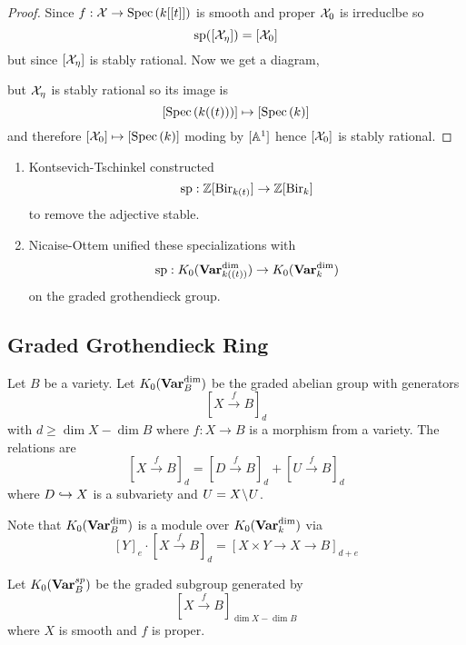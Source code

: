\documentclass[12pt]{article}
\begin{document}
\begin{proof}
Since $f : \mathcal{X} \to \mathrm{Spec}\left( k[[t]] \right)$ is smooth and proper $\mathcal{X}_0$ is irreduclbe so
\[ \mathrm{sp}([\mathcal{X}_\eta]) = [\mathcal{X}_0] \]
but since $[\mathcal{X}_{\eta}]$ is stably rational. Now we get a diagram,
\begin{center}
\end{center}
but $\mathcal{X}_{\eta}$ is stably rational so its image is
\[ [\mathrm{Spec}\left( k((t)) \right)] \mapsto [\mathrm{Spec}\left( k \right)] \]
and therefore $[\mathcal{X}_0] \mapsto [\mathrm{Spec}\left( k \right)]$ moding by $[\mathbb{A}^1]$ hence $[\mathcal{X}_0]$ is stably rational. 
\end{proof}

\begin{rmk}
\begin{enumerate}
\item Kontsevich-Tschinkel constructed
\[ \mathrm{sp} : \mathbb{Z}[\mathrm{Bir}_{k(t)}] \to \mathbb{Z}[\mathrm{Bir}_k] \]
to remove the adjective stable. 

\item Nicaise-Ottem unified these specializations with
\[ \mathrm{sp} : K_0(\mathbf{Var}^{\dim}_{k((t))}) \to K_0(\mathbf{Var}_k^{\dim}) \]
on the graded grothendieck group.
\end{enumerate}
\end{rmk}

\subsection{Graded Grothendieck Ring}

\newcommand{\PP}{\mathbb{P}}

\begin{defn}
Let $B$ be a variety. Let $K_0(\mathbf{Var}_B^{\dim})$ be the graded abelian group with generators
\[ [X \xrightarrow{f} B]_d \]
with $d \ge \dim{X} - \dim{B}$ where $f : X \to B$ is a morphism from a variety. The relations are
\[ [X \xrightarrow{f} B]_d = [D \xrightarrow{f} B]_d + [U \xrightarrow{f} B]_d \]
where $D \hookrightarrow X$ is a subvariety and $U = X \! \setminus \! U$. 
\end{defn}

Note that $K_0(\mathbf{Var}_B^{\dim})$ is a module over $K_0(\mathbf{Var}_k^{\dim})$ via
\[ [Y]_{e} \cdot [X \xrightarrow{f} B]_d = [X \times Y \to X \to B]_{d+e} \]

\begin{defn}
Let $K_0(\mathbf{Var}_B^{sp})$ be the graded subgroup generated by 
\[ [X \xrightarrow{f} B]_{\dim{X} - \dim{B}} \]
where $X$ is smooth and $f$ is proper. 
\end{defn}
\end{document}
